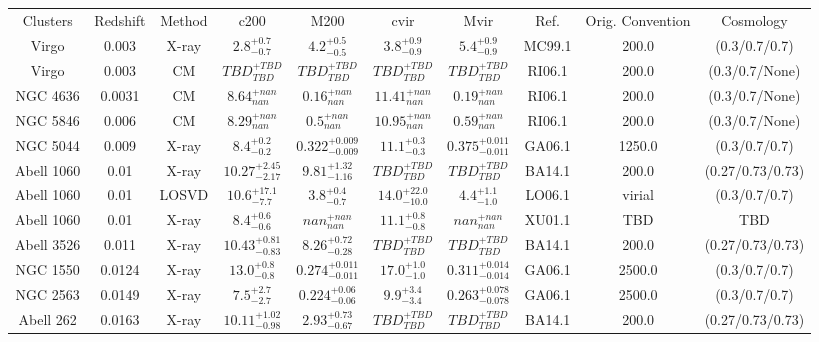 \begin{table}
\begin{tabular}{cccccccccc}
Clusters & Redshift & Method & c200 & M200 & cvir & Mvir & Ref. & Orig. Convention & Cosmology \\
Virgo & 0.003 & X-ray & ${2.8}^{+0.7}_{-0.7}$ & ${4.2}^{+0.5}_{-0.5}$ & ${3.8}^{+0.9}_{-0.9}$ & ${5.4}^{+0.9}_{-0.9}$ & MC99.1 & 200.0 & (0.3/0.7/0.7) \\
Virgo & 0.003 & CM & ${TBD}^{+TBD}_{TBD}$ & ${TBD}^{+TBD}_{TBD}$ & ${TBD}^{+TBD}_{TBD}$ & ${TBD}^{+TBD}_{TBD}$ & RI06.1 & 200.0 & (0.3/0.7/None) \\
NGC 4636 & 0.0031 & CM & ${8.64}^{+nan}_{nan}$ & ${0.16}^{+nan}_{nan}$ & ${11.41}^{+nan}_{nan}$ & ${0.19}^{+nan}_{nan}$ & RI06.1 & 200.0 & (0.3/0.7/None) \\
NGC 5846 & 0.006 & CM & ${8.29}^{+nan}_{nan}$ & ${0.5}^{+nan}_{nan}$ & ${10.95}^{+nan}_{nan}$ & ${0.59}^{+nan}_{nan}$ & RI06.1 & 200.0 & (0.3/0.7/None) \\
NGC 5044 & 0.009 & X-ray & ${8.4}^{+0.2}_{-0.2}$ & ${0.322}^{+0.009}_{-0.009}$ & ${11.1}^{+0.3}_{-0.3}$ & ${0.375}^{+0.011}_{-0.011}$ & GA06.1 & 1250.0 & (0.3/0.7/0.7) \\
Abell 1060 & 0.01 & X-ray & ${10.27}^{+2.45}_{-2.17}$ & ${9.81}^{+1.32}_{-1.16}$ & ${TBD}^{+TBD}_{TBD}$ & ${TBD}^{+TBD}_{TBD}$ & BA14.1 & 200.0 & (0.27/0.73/0.73) \\
Abell 1060 & 0.01 & LOSVD & ${10.6}^{+17.1}_{-7.7}$ & ${3.8}^{+0.4}_{-0.7}$ & ${14.0}^{+22.0}_{-10.0}$ & ${4.4}^{+1.1}_{-1.0}$ & LO06.1 & virial & (0.3/0.7/0.7) \\
Abell 1060 & 0.01 & X-ray & ${8.4}^{+0.6}_{-0.6}$ & ${nan}^{+nan}_{nan}$ & ${11.1}^{+0.8}_{-0.8}$ & ${nan}^{+nan}_{nan}$ & XU01.1 & TBD & TBD \\
Abell 3526 & 0.011 & X-ray & ${10.43}^{+0.81}_{-0.83}$ & ${8.26}^{+0.72}_{-0.28}$ & ${TBD}^{+TBD}_{TBD}$ & ${TBD}^{+TBD}_{TBD}$ & BA14.1 & 200.0 & (0.27/0.73/0.73) \\
NGC 1550 & 0.0124 & X-ray & ${13.0}^{+0.8}_{-0.8}$ & ${0.274}^{+0.011}_{-0.011}$ & ${17.0}^{+1.0}_{-1.0}$ & ${0.311}^{+0.014}_{-0.014}$ & GA06.1 & 2500.0 & (0.3/0.7/0.7) \\
NGC 2563 & 0.0149 & X-ray & ${7.5}^{+2.7}_{-2.7}$ & ${0.224}^{+0.06}_{-0.06}$ & ${9.9}^{+3.4}_{-3.4}$ & ${0.263}^{+0.078}_{-0.078}$ & GA06.1 & 2500.0 & (0.3/0.7/0.7) \\
Abell 262 & 0.0163 & X-ray & ${10.11}^{+1.02}_{-0.98}$ & ${2.93}^{+0.73}_{-0.67}$ & ${TBD}^{+TBD}_{TBD}$ & ${TBD}^{+TBD}_{TBD}$ & BA14.1 & 200.0 & (0.27/0.73/0.73) \\

\end{tabular}
\end{table}
